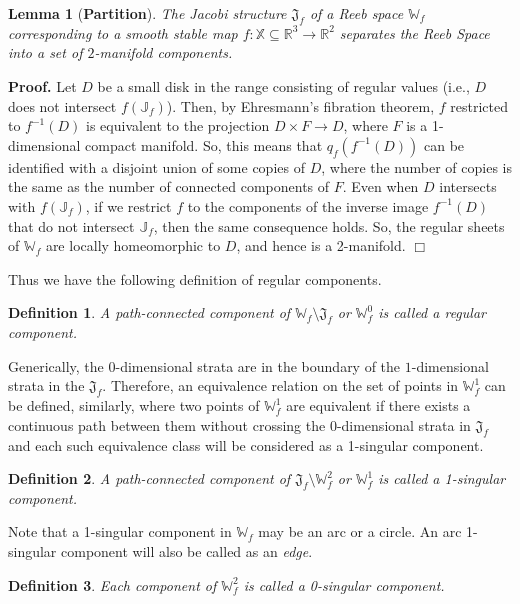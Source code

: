\documentclass[twocolumn]{article}
\newtheorem{lemma}[theorem]{Lemma}
\newcommand{\J}{\mathbb{J}}
\newcommand{\RS}{\mathbb{W}_f}
\newcommand{\JS}{\mathfrak{J}_f}
\newtheorem{dfn}{Definition}[section]
\renewenvironment{proof}{{\bf Proof. }}{\hspace*{\fill}$\Box$\bigskip\noindent}
\begin{document}
\begin{lemma}[\textbf{Partition}]
\label{lem:partition}
The Jacobi structure $\JS$  of a Reeb space $\RS$ corresponding to a smooth
stable map $f:\mathbb{X}\subseteq \mathbb{R}^3\rightarrow \mathbb{R}^2$ separates  the Reeb Space into a set
of $2$-manifold components.
\end{lemma}
\noindent
\begin{proof}
Let $D$ be a small disk in the range consisting of
regular values (i.e., $D$ does not intersect $f(\J_f)$).
Then, by Ehresmann's fibration theorem,
$f$ restricted to $ f^{-1}(D)$ is equivalent to
the projection $D \times F \rightarrow D$, where
$F$ is a 1-dimensional compact manifold.
So, this means that $q_f(f^{-1}(D))$ can
be identified with a disjoint union
of some copies of $D$, where the number of copies
is the same as the number of connected components
of $F$. Even when $D$ intersects with $f(\J_f)$,
if we restrict $f$ to the components
of the inverse image $f^{-1}(D)$ that do not
intersect $\J_f$, then the same consequence holds.
So, the regular sheets of $\RS$ are locally
homeomorphic to $D$, and hence is a 2-manifold.
\end{proof}

\noindent
Thus we have the following definition of regular components.

\begin{dfn}
A path-connected component of $\RS\setminus\JS$ or $\RS^0$ is called a regular component. 
\end{dfn}

\noindent
Generically, the $0$-dimensional strata are in the boundary of
the $1$-dimensional strata in the $\JS$.
Therefore, an equivalence relation on the set of points in $\RS^1$  can
be defined, similarly, where two points of $\RS^1$ are equivalent if there exists a continuous path between
them without crossing the $0$-dimensional strata in $\JS$ and each such equivalence
class will be considered as a 1-singular component.

\begin{dfn}
A path-connected component of $\JS\setminus \RS^2$ or $\RS^1$ is called a 1-singular component.
\end{dfn}

\noindent
Note that a 1-singular component in $\RS$ may be an arc or a circle. An arc
1-singular component will also be called as an \emph{edge}.

\begin{dfn}
Each component of $\RS^2$ is called a 0-singular component.
\end{dfn}
\end{document}
